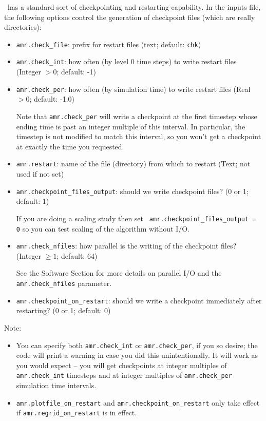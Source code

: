 \pelelm\ has a standard sort of checkpointing and restarting capability. 
In the inputs file, the following options control the generation of
checkpoint files (which are really directories):
\begin{itemize}
\item {\tt amr.check\_file}: prefix for restart files (text; default: {\tt chk}) 

\item {\tt amr.check\_int}: how often (by level 0 time steps) to write
   restart files (Integer $> 0$; default: -1)

\item {\tt amr.check\_per}: how often (by simulation time) to
  write restart files (Real $> 0$; default: -1.0)

  Note that {\tt amr.check\_per} will write a checkpoint at the first
  timestep whose ending time is past an integer multiple of this interval.
  In particular, the timestep is not modified to match this interval, so
  you won't get a checkpoint at exactly the time you requested.

\item {\tt amr.restart}: name of the file (directory) from which to restart
  (Text; not used if not set)

\item {\tt amr.checkpoint\_files\_output}: should we write checkpoint files? (0 or 1; default: 1)

  If you are doing a scaling study then set {\tt
  amr.checkpoint\_files\_output = 0} so you can test scaling of the
  algorithm without I/O.

\item {\tt amr.check\_nfiles}: how parallel is the writing of the checkpoint files?
  (Integer $\geq 1$; default: 64)

  See the Software Section for more details on parallel I/O and the 
  {\tt amr.check\_nfiles} parameter.

\item {\tt amr.checkpoint\_on\_restart}: should we write a checkpoint immediately after restarting?
  (0 or 1; default: 0)
\end{itemize}


Note:
\begin{itemize}

\item You can specify both {\tt amr.check\_int} or {\tt amr.check\_per},
  if you so desire; the code will print a warning in case you did this
  unintentionally. It will work as you would expect -- you will get checkpoints
  at integer multiples of {\tt amr.check\_int} timesteps and at integer
  multiples of {\tt amr.check\_per} simulation time intervals.

\item {\tt amr.plotfile\_on\_restart} and {\tt amr.checkpoint\_on\_restart} 
only take effect if {\tt amr.regrid\_on\_restart} is in effect.
\end{itemize}

